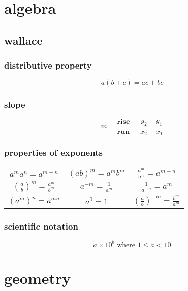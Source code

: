 \documentclass[a4paper,12pt]{article}
\author{m7tkr}
\begin{document}
\tableofcontents

\section{algebra}

\subsection{wallace}

\subsubsection{distributive property}

\[
a(b+c)=ac+bc
\]

\subsubsection{slope}

\[
\mathit{m}=\frac{\textbf{rise}}{\textbf{run}}=\frac{y_2-y_1}{x_2-x_1}
\]

\subsubsection{properties of exponents}
\begin{center}

\begin{tabular}{*{3}c}
\( a^{m}a^n=a^{m+n} \) & \( (ab)^m=a^{m}b^{m} \) & \( \frac{a^m}{a^n}=a^{m-n} \) \\
\( \left(\frac{a}{b}\right)^m=\frac{a^m}{b^m} \) & \( a^{-m}=\frac{1}{a^m} \) & \( \frac{1}{a^{-m}}=a^m \) \\
\( (a^m)^n=a^{mn} \) & \( a^0=1 \) & \(
\left(\frac{a}{b}\right)^{-m}=\frac{b^m}{a^m} \) \\[1cm]
\end{tabular} 
\end{center}

\subsubsection{scientific notation}

\[
a \times 10^b \textrm{ where }1 \leqslant a < 10
\]

\section{geometry}
\end{document}

